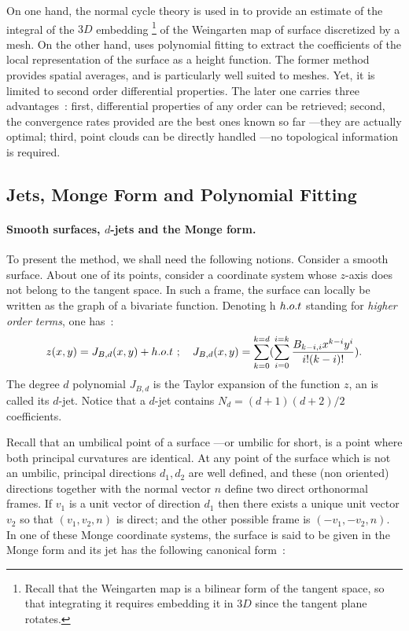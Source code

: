 On one hand, the normal cycle theory is used in
\cite{cgal:csm-rdtnc-03} to provide an estimate of the  integral of the
$3D$ embedding \footnote{Recall that the Weingarten map is a bilinear
form of the tangent space, so that integrating it requires embedding
it in $3D$ since the tangent plane rotates.} of the Weingarten map of
surface discretized by a mesh.  On the other hand,
\cite{cgal:cp-edqpf-05} uses polynomial fitting to extract the
coefficients of the local representation of the surface as a height
function. The former method provides spatial averages, and is
particularly well suited to meshes. Yet, it is limited to second order
differential properties.
The later one carries three advantages~: first, differential
properties of any order can be retrieved; second, the convergence
rates provided are the best ones known so far ---they are actually
optimal; third, point clouds can be directly handled ---no topological
information is required.


\subsection{Jets, Monge Form and Polynomial Fitting}

\paragraph{Smooth surfaces, $d$-jets and the Monge form.}
%
To present the method, we shall need the following notions. Consider a
smooth surface.  About one of its points, consider a coordinate system
whose $z$-axis does not belong to the tangent space. In such a frame,
the surface can locally be written as the graph of a bivariate
function. Denoting h $h.o.t$ standing for {\em higher order terms}, one
has~:
%
\begin{equation}
z(x,y)=J_{B,d}(x,y) + h.o.t \ ; \quad 
J_{B,d}(x,y)=\sum_{k=0}^{k=d}(\sum_{i=0}^{i=k}
\frac{B_{k-i,i}x^{k-i}y^{i}}{i!(k-i)!}).
\end{equation}
The degree $d$ polynomial $J_{B,d}$ is the Taylor expansion of the
function $z$, an is called its $d$-jet. Notice that a $d$-jet contains
$N_d=(d+1)(d+2)/2$ coefficients.

Recall that an umbilical point of a surface ---or umbilic for short,
is a point where both principal curvatures are identical.  At any
point of the surface which is not an umbilic, principal directions
$d_1, d_2$ are well defined, and these (non oriented) directions
together with the normal vector $n$ define two direct orthonormal
frames. If $v_1$ is a unit vector of direction $d_1$ then there exists
a unique unit vector $v_2$ so that $(v_1,v_2,n)$ is direct; and the
other possible frame is $(-v_1,-v_2,n)$. In one of these Monge
coordinate systems, the surface is said to be given in the Monge form
and its jet has the following canonical form~:

